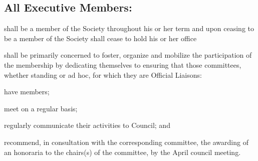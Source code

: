 \subsection [The Executive (General)]{All Executive Members:}
\begin{longenum}[ label*=\thesection.\arabic*., align=left]
	\item shall be a member of the Society throughout his or her term and upon ceasing to be a member of the Society shall cease to hold his or her office
    \item shall be primarily concerned to foster, organize and mobilize the participation of the membership by dedicating themselves to ensuring that those committees, whether standing  or ad hoc, for which they are Official Liaisons:
   \begin{longenum}[ label*=\arabic*., align=left]
		\item have members;
   		\item meet on a regular basis;
        \item regularly communicate their activities to Council; and
   		\item recommend, in consultation with the corresponding committee, the awarding of an honoraria to the chairs(s) of the committee, by the April council meeting.  
	\end{longenum}
	

\end{longenum}
